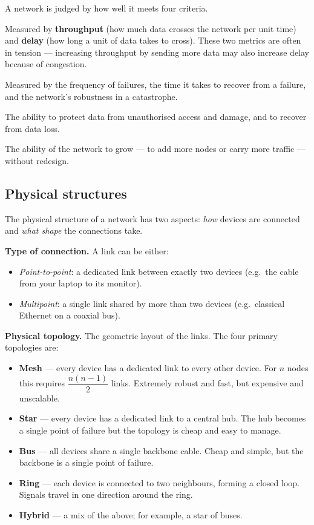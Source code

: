 \documentclass[
  letterpaper,
  DIV=11,
  numbers=noendperiod]{scrreprt}
\providecommand{\tightlist}{%
  \setlength{\itemsep}{0pt}\setlength{\parskip}{0pt}}
\begin{document}
A network is judged by how well it meets four criteria.

\begin{description}
\tightlist
\item[Performance]
Measured by \textbf{throughput} (how much data crosses the network per
unit time) and \textbf{delay} (how long a unit of data takes to cross).
These two metrics are often in tension --- increasing throughput by
sending more data may also increase delay because of congestion.
\item[Reliability]
Measured by the frequency of failures, the time it takes to recover from
a failure, and the network's robustness in a catastrophe.
\item[Security]
The ability to protect data from unauthorised access and damage, and to
recover from data loss.
\item[Scalability]
The ability of the network to grow --- to add more nodes or carry more
traffic --- without redesign.
\end{description}

\subsection{Physical structures}\label{physical-structures}

The physical structure of a network has two aspects: \emph{how} devices
are connected and \emph{what shape} the connections take.

\textbf{Type of connection.} A link can be either:

\begin{itemize}
\tightlist
\item
  \emph{Point-to-point}: a dedicated link between exactly two devices
  (e.g.~the cable from your laptop to its monitor).
\item
  \emph{Multipoint}: a single link shared by more than two devices
  (e.g.~classical Ethernet on a coaxial bus).
\end{itemize}

\textbf{Physical topology.} The geometric layout of the links. The four
primary topologies are:

\begin{itemize}
\tightlist
\item
  \textbf{Mesh} --- every device has a dedicated link to every other
  device. For \(n\) nodes this requires \(\dfrac{n(n-1)}{2}\) links.
  Extremely robust and fast, but expensive and unscalable.
\item
  \textbf{Star} --- every device has a dedicated link to a central hub.
  The hub becomes a single point of failure but the topology is cheap
  and easy to manage.
\item
  \textbf{Bus} --- all devices share a single backbone cable. Cheap and
  simple, but the backbone is a single point of failure.
\item
  \textbf{Ring} --- each device is connected to two neighbours, forming
  a closed loop. Signals travel in one direction around the ring.
\item
  \textbf{Hybrid} --- a mix of the above; for example, a star of buses.
\end{itemize}
\end{document}
